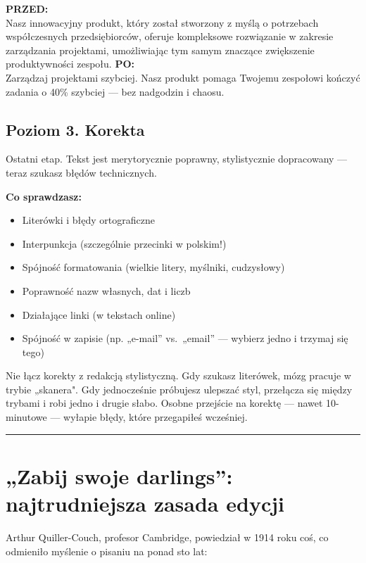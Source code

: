 \documentclass[
  12pt,
  a4paper,
  twoside,
  openright,
  12pt,
  DIV=12,
  BCOR=12mm]{scrbook}
\providecommand{\tightlist}{%
  \setlength{\itemsep}{0pt}\setlength{\parskip}{0pt}}\usepackage{longtable,booktabs,array}
\newcommand{\decoline}{%
  \begin{center}
    \textcolor{bordergray}{\rule{0.3\textwidth}{0.5pt}}
  \end{center}
}
\newcommand{\beforeafter}[2]{%
  \begin{tcolorbox}[
    enhanced,
    sidebyside,
    sidebyside align=top,
    lefthand width=0.47\textwidth,
    colback=white,
    colframe=bordergray,
    boxrule=0.5pt,
    arc=5pt,
    left=10pt, right=10pt, top=10pt, bottom=10pt
  ]
    \textbf{\color{accentred}PRZED:}\\[6pt]
    \small #1
    \tcblower
    \textbf{\color{accentgreen}PO:}\\[6pt]
    \small #2
  \end{tcolorbox}
}
\begin{document}
\beforeafter{Nasz innowacyjny produkt, który został stworzony z myślą o potrzebach współczesnych przedsiębiorców, oferuje kompleksowe rozwiązanie w zakresie zarządzania projektami, umożliwiając tym samym znaczące zwiększenie produktywności zespołu.}{Zarządzaj projektami szybciej. Nasz produkt pomaga Twojemu zespołowi kończyć zadania o 40\% szybciej --- bez nadgodzin i chaosu.}

\subsection{Poziom 3. Korekta}\label{poziom-3.-korekta}

Ostatni etap. Tekst jest merytorycznie poprawny, stylistycznie
dopracowany --- teraz szukasz błędów technicznych.

\textbf{Co sprawdzasz:}

\begin{itemize}
\tightlist
\item
  Literówki i błędy ortograficzne
\item
  Interpunkcja (szczególnie przecinki w polskim!)
\item
  Spójność formatowania (wielkie litery, myślniki, cudzysłowy)
\item
  Poprawność nazw własnych, dat i liczb
\item
  Działające linki (w tekstach online)
\item
  Spójność w zapisie (np. „e-mail'' vs.~„email'' --- wybierz jedno i
  trzymaj się tego)
\end{itemize}

\begin{wskazowka}
Nie łącz korekty z redakcją stylistyczną. Gdy szukasz literówek, mózg pracuje w trybie „skanera". Gdy jednocześnie próbujesz ulepszać styl, przełącza się między trybami i robi jedno i drugie słabo. Osobne przejście na korektę --- nawet 10-minutowe --- wyłapie błędy, które przegapiłeś wcześniej.
\end{wskazowka}

\decoline

\section{„Zabij swoje darlings'': najtrudniejsza zasada
edycji}\label{zabij-swoje-darlings-najtrudniejsza-zasada-edycji}

Arthur Quiller-Couch, profesor Cambridge, powiedział w 1914 roku coś, co
odmieniło myślenie o pisaniu na ponad sto lat:
\end{document}
